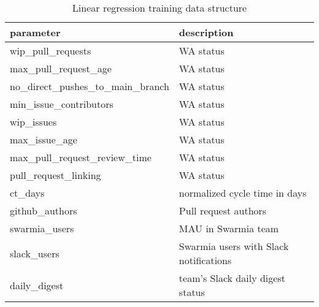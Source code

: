 \begin{table}
\begin{center}
\begin{tabularx}{\textwidth}{ |l|X| } 
\hline
parameter & description \\ [0.5ex] 
\hline\hline
wip\_pull\_requests & WA status \\
max\_pull\_request\_age & WA status \\
no\_direct\_pushes\_to\_main\_branch & WA status \\
min\_issue\_contributors  & WA status \\
wip\_issues & WA status \\
max\_issue\_age  & WA status \\
max\_pull\_request\_review\_time  & WA status \\
pull\_request\_linking  & WA status \\
ct\_days  & normalized cycle time in days \\
github\_authors & Pull request authors \\
swarmia\_users & MAU in Swarmia team \\
slack\_users & Swarmia users with Slack notifications \\
daily\_digest & team's Slack daily digest status \\
\hline
\end{tabularx}
\caption{Linear regression training data structure}
\label{tab:trainingDataStructure}
\end{center}
\end{table}


